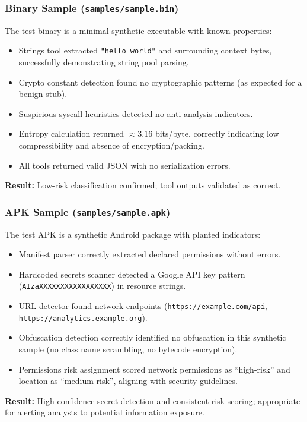 \documentclass[11pt]{article}
\begin{document}
\subsubsection{Binary Sample (\texttt{samples/sample.bin})}
The test binary is a minimal synthetic executable with known properties:
\begin{itemize}[leftmargin=*]
  \item Strings tool extracted \texttt{"hello\_world"} and surrounding context bytes, successfully demonstrating string pool parsing.
  \item Crypto constant detection found no cryptographic patterns (as expected for a benign stub).
  \item Suspicious syscall heuristics detected no anti-analysis indicators.
  \item Entropy calculation returned $\approx 3.16$ bits/byte, correctly indicating low compressibility and absence of encryption/packing.
  \item All tools returned valid JSON with no serialization errors.
\end{itemize}
\textbf{Result:} Low-risk classification confirmed; tool outputs validated as correct.

\subsubsection{APK Sample (\texttt{samples/sample.apk})}
The test APK is a synthetic Android package with planted indicators:
\begin{itemize}[leftmargin=*]
  \item Manifest parser correctly extracted declared permissions without errors.
  \item Hardcoded secrets scanner detected a Google API key pattern (\texttt{AIzaXXXXXXXXXXXXXXXXX}) in resource strings.
  \item URL detector found network endpoints (\texttt{https://example.com/api}, \texttt{https://analytics.example.org}).
  \item Obfuscation detection correctly identified no obfuscation in this synthetic sample (no class name scrambling, no bytecode encryption).
  \item Permissions risk assignment scored network permissions as ``high-risk'' and location as ``medium-risk'', aligning with security guidelines.
\end{itemize}
\textbf{Result:} High-confidence secret detection and consistent risk scoring; appropriate for alerting analysts to potential information exposure.
\end{document}
